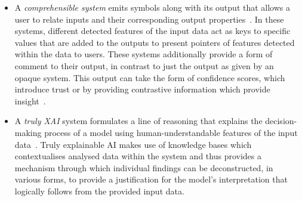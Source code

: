 \begin{itemize}
\item A \emph{comprehensible system} emits symbols along with its output that allows a user to relate inputs and their corresponding output properties~\cite{doran17}. In these systems, different detected features of the input data act as keys to specific values that are added to the outputs to present pointers of features detected within the data to users. These systems additionally provide a form of comment to their output, in contrast to just the output as given by an opaque system. This output can take the form of confidence scores, which introduce trust or by providing contrastive information which provide insight~\cite{chari20}.
  
\item A \emph{truly XAI} system formulates a line of reasoning that explains the decision-making process of a model using human-understandable features of the input data~\cite{doran17}. Truly explainable AI makes use of knowledge bases which contextualises analysed data within the system and thus provides a mechanism through which individual findings can be deconstructed, in various forms, to provide a justification for the model’s interpretation that logically follows from the provided input data.

\end{itemize}

